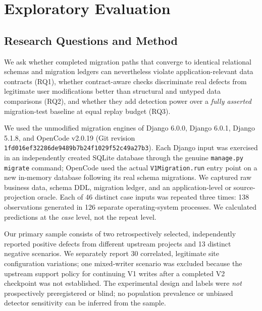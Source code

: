 \section{Exploratory Evaluation}
\label{sec:n22-evaluation}

\subsection{Research Questions and Method}
We ask whether completed migration paths that converge to identical relational
schemas and migration ledgers can nevertheless violate application-relevant
data contracts (RQ1), whether contract-aware checks discriminate real defects
from legitimate user modifications better than structural and untyped data
comparisons (RQ2), and whether they add detection power over a \emph{fully
asserted} migration-test baseline at equal replay budget (RQ3).

We used the unmodified migration engines of Django 6.0.0, Django 6.0.1, Django
5.1.8, and OpenCode v2.0.19 (Git revision
\texttt{1fd016ef32286de9489b7b24f1029f52c49a27b3}). Each Django input
was exercised in an independently created SQLite database through the genuine
\texttt{manage.py migrate} command; OpenCode used the actual
\texttt{V1Migration.run} entry point on a new in-memory database following its
real schema migrations. We captured raw business data, schema DDL, migration
ledger, and an application-level or source-projection oracle. Each of 46
distinct case inputs was repeated three times: 138 observations generated in
126 separate operating-system processes. We calculated predictions at the
\emph{case} level, not the repeat level.

Our primary sample consists of two retrospectively selected, independently
reported positive defects from different upstream projects and 13 distinct
negative scenarios. We separately report 30 correlated, legitimate site
configuration variations; one mixed-writer scenario was excluded because the
upstream support policy for continuing V1 writes after a completed V2
checkpoint was not established. The experimental design and labels were
\emph{not} prospectively preregistered or blind; no population prevalence or
unbiased detector sensitivity can be inferred from the sample.

